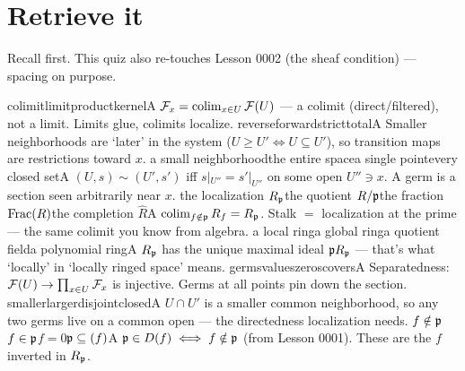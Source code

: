 \section{Retrieve it}

Recall first. This quiz also re-touches Lesson 0002 (the sheaf condition) --- spacing on purpose.

\begin{quizlist}
    {colimit}{limit}{product}{kernel}{A}
    {$\mathcal{F}_x=\operatorname*{colim}_{x\in U}\mathcal{F}(U)$ --- a colimit (direct/filtered), not a limit. Limits glue, colimits localize.}
    {reverse}{forward}{strict}{total}{A}
    {Smaller neighborhoods are `later' in the system ($U\ge U' \iff U\subseteq U'$), so transition maps are restrictions toward $x$.}
    {a small neighborhood}{the entire space}{a single point}{every closed set}{A}
    {$(U,s)\sim(U',s')$ iff $s|_{U''}=s'|_{U''}$ on some open $U''\ni x$. A germ is a section seen arbitrarily near $x$.}
    {the localization $R_{\mathfrak{p}}$}{the quotient $R/\mathfrak{p}$}{the fraction $\operatorname{Frac}(R)$}{the completion $\hat R$}{A}
    {$\operatorname*{colim}_{f\notin\mathfrak{p}} R_f = R_{\mathfrak{p}}$. Stalk $=$ localization at the prime --- the same colimit you know from algebra.}
    {a local ring}{a global ring}{a quotient field}{a polynomial ring}{A}
    {$R_{\mathfrak{p}}$ has the unique maximal ideal $\mathfrak{p} R_{\mathfrak{p}}$ --- that's what `locally' in `locally ringed space' means.}
    {germs}{values}{zeros}{covers}{A}
    {Separatedness: $\mathcal{F}(U)\to\prod_{x\in U}\mathcal{F}_x$ is injective. Germs at all points pin down the section.}
    {smaller}{larger}{disjoint}{closed}{A}
    {$U\cap U'$ is a smaller common neighborhood, so any two germs live on a common open --- the directedness localization needs.}
    {$f\notin\mathfrak{p}$}{$f\in\mathfrak{p}$}{$f=0$}{$\mathfrak{p}\subseteq(f)$}{A}
    {$\mathfrak{p}\in D(f)\iff f\notin\mathfrak{p}$ (from Lesson 0001). These are the $f$ inverted in $R_{\mathfrak{p}}$.}
\end{quizlist}

